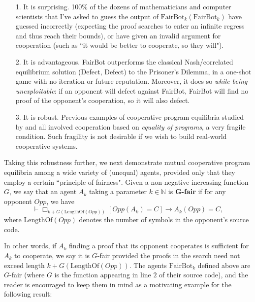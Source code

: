 \documentclass[jsl,reqno,bibay2]{asl}
\numberwithin{equation}{section}
\theoremstyle{definition}
\newcommand{\NN}{\mathbb{N}}
\newcommand{\proves}[1]{\underset{#1}{\vdash}}
\newcommand{\bx}[1]{\Box_{#1}}
\renewcommand{\implies}{\rightarrow}
\renewcommand{\-}{^{-1}}
\newcommand{\FB}{\mathrm{FairBot}}
\begin{document}
\begin{itemize}
\item[1.]  It is surprising.  100\% of the dozens of mathematicians and computer scientists that I've asked to guess the output of $\FB_k(\FB_k)$ have guessed incorrectly (expecting the proof searches to enter an infinite regress and thus reach their bounds), or have given an invalid argument for cooperation (such as ``it would be better to cooperate, so they will").
\item[2.] It is advantageous. FairBot outperforms the classical Nash/correlated equilibrium solution (Defect, Defect) to the Prisoner's Dilemma, in a one-shot game with no iteration or future reputation.  Moreover, it does so {\em while being unexploitable}: if an opponent will defect against FairBot, FairBot will find no proof of the opponent's cooperation, so it will also defect.  
\item[3.] It is robust.  Previous examples of cooperative program equilibria studied by \cite{Tennenholtz:2004:Program} and \cite{Fortnow:2009:Program} all involved cooperation based on {\em equality of programs}, a very fragile condition.  Such fragility is not desirable if we wish to build real-world cooperative systems.  
\end{itemize}

Taking this robustness further, we next demonstrate mutual cooperative program equilibria among a wide variety of (unequal) agents, provided only that they employ a certain ``principle of fairness".  Given a non-negative increasing function $G$, we say that an agent $A_k$ taking a parameter $k \in \NN$ is {\bf G-fair} if for any opponent $Opp$, we have
$$\proves{} \bx{k+G(\textrm{LengthOf}(Opp))}[Opp(A_k) = C] \implies A_k(Opp) = C,$$
where $\textrm{LengthOf}(Opp)$ denotes the number of symbols in the opponent's source code.

In other words, if $A_k$ finding a proof that its opponent cooperates is sufficient for $A_k$ to cooperate, we say it is $G$-fair provided the proofs in the search need not exceed length $k+G(\textrm{LengthOf}(Opp))$.  The agents $\FB_k$ defined above are $G$-fair (where $G$ is the function appearing in line $2$ of their source code), and the reader is encouraged to keep them in mind as a motivating example for the following result:
\end{document}
